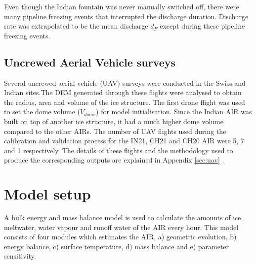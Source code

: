 \documentclass[utf8]{frontiersSCNS} %
\begin{document}
Even though the Indian fountain was never manually switched off, there were many pipeline freezing events that
interrupted the discharge duration. Discharge rate was extrapolated to be the mean discharge $d_F$ except during
these pipeline freezing events.

\subsection{Uncrewed Aerial Vehicle surveys}

Several uncrewed aerial vehicle (UAV) surveys were conducted in the Swiss and Indian sites.The DEM generated
through these flights were analysed to obtain the radius, area and volume of the ice structure.  The first drone
flight was used to set the dome volume ($V_{dome}$) for model initialisation. Since the Indian AIR was built on top
of another ice structure, it had a much higher dome volume compared to the other AIRs. The number of UAV flights
used during the calibration and validation process for the IN21, CH21 and CH20 AIR were 5, 7 and 1 respectively.
The details of these flights and the methodology used to produce the corresponding outputs are explained in
Appendix \ref{sec:uav} .

\section{Model setup}

A bulk energy and mass balance model is used to calculate the amounts of ice, meltwater, water vapour and runoff water
of the AIR every hour. This model consists of four modules which estimates the AIR, a) geometric evolution, b) energy
balance, c) surface temperature, d) mass balance and e) parameter sensitivity.
\end{document}
